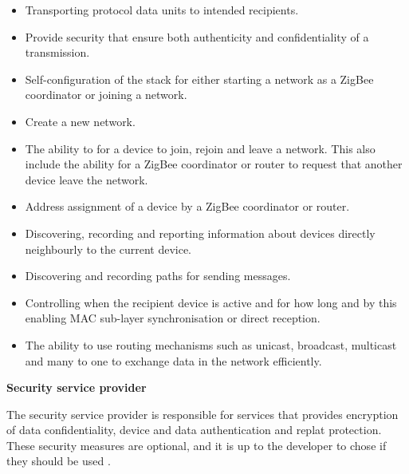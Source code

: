 \begin{itemize}
   \item Transporting protocol data units to intended recipients.
   \item Provide security that ensure both authenticity and confidentiality of a transmission.
   \item Self-configuration of the stack for either starting a network as a ZigBee coordinator or joining a network.
   \item Create a new network. 
   \item The ability to for a device to join, rejoin and leave a network. This also include the ability for a ZigBee coordinator or router to request that another device leave the network.
   \item Address assignment of a device by a ZigBee coordinator or router.
   \item Discovering, recording and reporting information about devices directly neighbourly to the current device.
  \item Discovering and recording paths for sending messages.
  \item Controlling when the recipient device is active and for how long and by this enabling MAC sub-layer synchronisation or direct reception.
  \item The ability to use routing mechanisms such as unicast, broadcast, multicast and many to one to exchange data in the network efficiently.
\end{itemize}

\vspace{5mm}
\textbf{Security service provider}

The security service provider is responsible for services that provides encryption of data confidentiality, device and data authentication and replat protection. These security measures are optional, and it is up to the developer to chose if they should be used \citep{farahani2011zigbee}.

